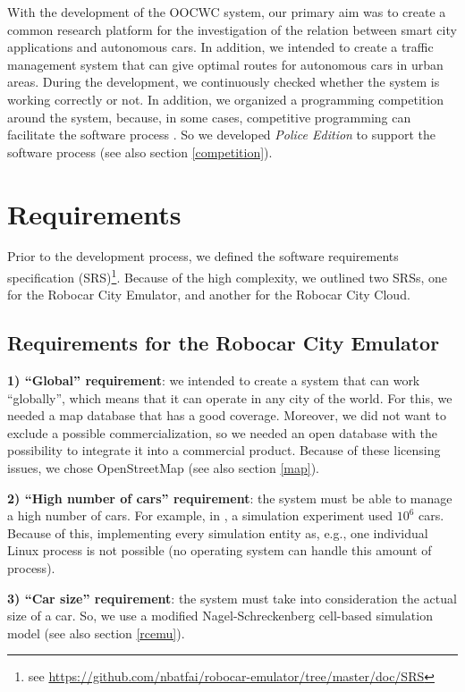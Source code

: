 \documentclass[b5paper,12pt]{report}
\theoremstyle{definition}
\begin{document}
With the development of the OOCWC system, our primary aim was to create a common research platform for the investigation of the relation between smart city applications and autonomous cars. In addition, we intended to create a traffic management system that can give optimal routes for autonomous cars in urban areas. During the development, we continuously checked whether the system is working correctly or not. In addition, we organized a programming competition around the system, because, in some cases, competitive programming can facilitate the software process \cite{compprog}. So we developed \textit{Police Edition} to support the software process (see also section \ref{competition}).

\section{Requirements}

Prior to the development process, we defined the software requirements specification (SRS)\footnote{see \url{https://github.com/nbatfai/robocar-emulator/tree/master/doc/SRS}}. Because of the high complexity, we outlined two SRSs, one for the Robocar City Emulator, and another for the Robocar City Cloud.

\subsection{Requirements for the Robocar City Emulator}

{\bf{1) \enquote{Global} requirement}}: we intended to create a system that can work \enquote{globally}, which means that it can operate in any city of the world. For this, we needed a map database that has a good coverage. Moreover, we did not want to exclude a possible commercialization, so we needed an open database with the possibility to integrate it into a commercial product. Because of these licensing issues, we chose OpenStreetMap (see also section \ref{map}).

{\bf{2) \enquote{High number of cars} requirement}}: the system must be able to manage a high number of cars. For example, in \cite{singapore}, a simulation experiment used $10^6$ cars. Because of this, implementing every simulation entity as, e.g., one individual Linux process is not possible (no operating system can handle this amount of process).

{\bf{3) \enquote{Car size} requirement}}: the system must take into consideration the actual size of a car. So, we use a modified Nagel-Schreckenberg cell-based simulation model \cite{nasch} (see also section \ref{rcemu}).
\end{document}
